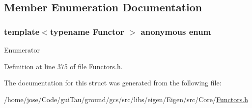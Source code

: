 \subsection{Member Enumeration Documentation}
\hypertarget{structei__functor__allows__mixing__real__and__complex_afea9dae1426a2fd339643567c3a63dd5}{\subsubsection[{anonymous enum}]{\setlength{\rightskip}{0pt plus 5cm}template$<$typename Functor $>$ anonymous enum}}\label{structei__functor__allows__mixing__real__and__complex_afea9dae1426a2fd339643567c3a63dd5}
\begin{Desc}
\item[Enumerator]\par
\begin{description}
\item[{\em 
\hypertarget{structei__functor__allows__mixing__real__and__complex_afea9dae1426a2fd339643567c3a63dd5af9a2d2b7d885be46bd1f5966462813e3}{ret}\label{structei__functor__allows__mixing__real__and__complex_afea9dae1426a2fd339643567c3a63dd5af9a2d2b7d885be46bd1f5966462813e3}
}]\end{description}
\end{Desc}


Definition at line 375 of file Functors.\-h.



The documentation for this struct was generated from the following file\-:\begin{DoxyCompactItemize}
\item 
/home/jose/\-Code/gui\-Tau/ground/gcs/src/libs/eigen/\-Eigen/src/\-Core/\hyperlink{_core_2_functors_8h}{Functors.\-h}\end{DoxyCompactItemize}
